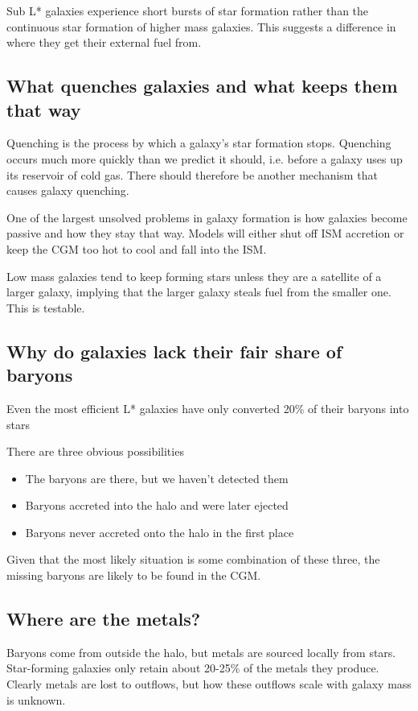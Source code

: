 \documentclass[12pt]{article}
\begin{document}
Sub L* galaxies experience short bursts of star formation rather than the continuous star formation of higher mass galaxies. This suggests a difference in where they get their external fuel from. 

\subsection{What quenches galaxies and what keeps them that way}
Quenching is the process by which a galaxy's star formation stops. Quenching occurs much more quickly than we predict it should, i.e. before a galaxy uses up its reservoir of cold gas. There should therefore be another mechanism that causes galaxy quenching. 

One of the largest unsolved problems in galaxy formation is how galaxies become passive and how they stay that way. Models will either shut off ISM accretion or keep the CGM too hot to cool and fall into the ISM.

Low mass galaxies tend to keep forming stars unless they are a satellite of a larger galaxy, implying that the larger galaxy steals fuel from the smaller one. This is testable.

\subsection{Why do galaxies lack their fair share of baryons}
Even the most efficient L* galaxies have only converted 20\% of their baryons into stars

There are three obvious possibilities
\begin{itemize}
\item{The baryons are there, but we haven't detected them}
\item{Baryons accreted into the halo and were later ejected}
\item{Baryons never accreted onto the halo in the first place}
\end{itemize}

Given that the most likely situation is some combination of these three, the missing baryons are likely to be found in the CGM.

\subsection{Where are the metals?}
Baryons come from outside the halo, but metals are sourced locally from stars. Star-forming galaxies only retain about 20-25\% of the metals they produce. Clearly metals are lost to outflows, but how these outflows scale with galaxy mass is unknown. 
\end{document}

